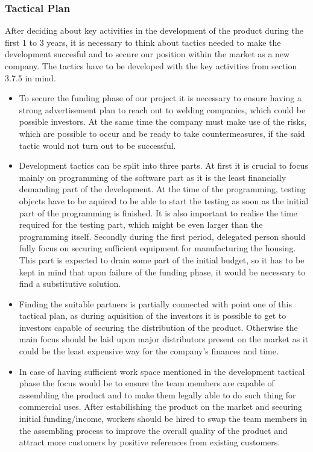 \subsubsection{Tactical Plan}
After deciding about key activities in the development of the product during the first 1 to 3 years, it is necessary to think about tactics needed to make the development succesful and to secure our position within the market as a new company.
The tactics have to be developed with the key activities from section 3.7.5 in mind.

\begin{itemize}
\item To secure the funding phase of our project it is necessary to ensure having a strong advertisement plan to reach out to welding companies, which could be possible investors. At the same time the company must make use of the risks, which are possible to occur and be ready to take countermeasures, if the said tactic would not turn out to be successful. 
\item Development tactics can be split into three parts. At first it is crucial to focus mainly on programming of the software part as it is the least financially demanding part of the development. At the time of the programming, testing objects have to be aquired to be able to start the testing as soon as the initial part of the programming is finished. It is also important to realise the time required for the testing part, which might be even larger than the programming itself. Secondly during the first period, delegated person should fully focus on securing sufficient equipment for manufacturing the housing. This part is expected to drain some part of the initial budget, so it has to be kept in mind that upon failure of the funding phase, it would be necessary to find a substitutive solution.
\item Finding the suitable partners is partially connected with point one of this tactical plan, as during aquisition of the investors it is possible to get to investors capable of securing the distribution of the product. Otherwise the main focus should be laid upon major distributors present on the market as it could be the least expensive way for the company's finances and time.
\item In case of having sufficient work space mentioned in the development tactical phase the focus would be to ensure the team members are capable of assembling the product and to make them legally able to do such thing for commercial uses. After estabilishing the product on the market and securing initial funding/income, workers should be hired to swap the team members in the assembling process to improve the overall quality of the product and attract more customers by positive references from existing customers.

\end{itemize}
